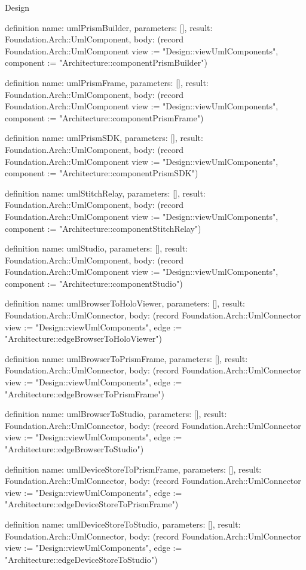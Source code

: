 \begin{lexlean}{Design}
\begin{semanticmodule}
definition{
  name: umlPrismBuilder,
  parameters: [],
  result: Foundation.Arch::UmlComponent,
  body: (record Foundation.Arch::UmlComponent {view := "Design::viewUmlComponents", component := "Architecture::componentPrismBuilder"})
}

definition{
  name: umlPrismFrame,
  parameters: [],
  result: Foundation.Arch::UmlComponent,
  body: (record Foundation.Arch::UmlComponent {view := "Design::viewUmlComponents", component := "Architecture::componentPrismFrame"})
}

definition{
  name: umlPrismSDK,
  parameters: [],
  result: Foundation.Arch::UmlComponent,
  body: (record Foundation.Arch::UmlComponent {view := "Design::viewUmlComponents", component := "Architecture::componentPrismSDK"})
}

definition{
  name: umlStitchRelay,
  parameters: [],
  result: Foundation.Arch::UmlComponent,
  body: (record Foundation.Arch::UmlComponent {view := "Design::viewUmlComponents", component := "Architecture::componentStitchRelay"})
}

definition{
  name: umlStudio,
  parameters: [],
  result: Foundation.Arch::UmlComponent,
  body: (record Foundation.Arch::UmlComponent {view := "Design::viewUmlComponents", component := "Architecture::componentStudio"})
}

definition{
  name: umlBrowserToHoloViewer,
  parameters: [],
  result: Foundation.Arch::UmlConnector,
  body: (record Foundation.Arch::UmlConnector {view := "Design::viewUmlComponents", edge := "Architecture::edgeBrowserToHoloViewer"})
}

definition{
  name: umlBrowserToPrismFrame,
  parameters: [],
  result: Foundation.Arch::UmlConnector,
  body: (record Foundation.Arch::UmlConnector {view := "Design::viewUmlComponents", edge := "Architecture::edgeBrowserToPrismFrame"})
}

definition{
  name: umlBrowserToStudio,
  parameters: [],
  result: Foundation.Arch::UmlConnector,
  body: (record Foundation.Arch::UmlConnector {view := "Design::viewUmlComponents", edge := "Architecture::edgeBrowserToStudio"})
}

definition{
  name: umlDeviceStoreToPrismFrame,
  parameters: [],
  result: Foundation.Arch::UmlConnector,
  body: (record Foundation.Arch::UmlConnector {view := "Design::viewUmlComponents", edge := "Architecture::edgeDeviceStoreToPrismFrame"})
}

definition{
  name: umlDeviceStoreToStudio,
  parameters: [],
  result: Foundation.Arch::UmlConnector,
  body: (record Foundation.Arch::UmlConnector {view := "Design::viewUmlComponents", edge := "Architecture::edgeDeviceStoreToStudio"})
}


\end{semanticmodule}
\end{lexlean}
